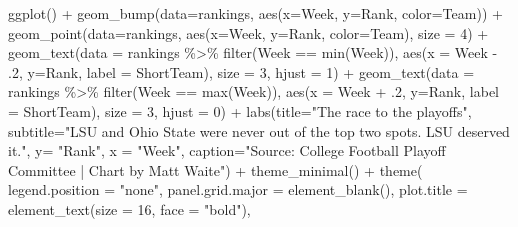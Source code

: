 \documentclass[
]{book}
\newenvironment{Shaded}{\begin{snugshade}}{\end{snugshade}}
\newcommand{\AttributeTok}[1]{\textcolor[rgb]{0.77,0.63,0.00}{#1}}
\newcommand{\DecValTok}[1]{\textcolor[rgb]{0.00,0.00,0.81}{#1}}
\newcommand{\FunctionTok}[1]{\textcolor[rgb]{0.00,0.00,0.00}{#1}}
\newcommand{\NormalTok}[1]{#1}
\newcommand{\SpecialCharTok}[1]{\textcolor[rgb]{0.00,0.00,0.00}{#1}}
\newcommand{\StringTok}[1]{\textcolor[rgb]{0.31,0.60,0.02}{#1}}
\begin{document}
\begin{Shaded}
\begin{Highlighting}[]
\FunctionTok{ggplot}\NormalTok{() }\SpecialCharTok{+} 
  \FunctionTok{geom\_bump}\NormalTok{(}\AttributeTok{data=}\NormalTok{rankings, }\FunctionTok{aes}\NormalTok{(}\AttributeTok{x=}\NormalTok{Week, }\AttributeTok{y=}\NormalTok{Rank, }\AttributeTok{color=}\NormalTok{Team)) }\SpecialCharTok{+} 
  \FunctionTok{geom\_point}\NormalTok{(}\AttributeTok{data=}\NormalTok{rankings, }\FunctionTok{aes}\NormalTok{(}\AttributeTok{x=}\NormalTok{Week, }\AttributeTok{y=}\NormalTok{Rank, }\AttributeTok{color=}\NormalTok{Team), }\AttributeTok{size =} \DecValTok{4}\NormalTok{) }\SpecialCharTok{+}   
  \FunctionTok{geom\_text}\NormalTok{(}\AttributeTok{data =}\NormalTok{ rankings }\SpecialCharTok{\%\textgreater{}\%} \FunctionTok{filter}\NormalTok{(Week }\SpecialCharTok{==} \FunctionTok{min}\NormalTok{(Week)), }\FunctionTok{aes}\NormalTok{(}\AttributeTok{x =}\NormalTok{ Week }\SpecialCharTok{{-}}\NormalTok{ .}\DecValTok{2}\NormalTok{, }\AttributeTok{y=}\NormalTok{Rank, }\AttributeTok{label =}\NormalTok{ ShortTeam), }\AttributeTok{size =} \DecValTok{3}\NormalTok{, }\AttributeTok{hjust =} \DecValTok{1}\NormalTok{) }\SpecialCharTok{+}
  \FunctionTok{geom\_text}\NormalTok{(}\AttributeTok{data =}\NormalTok{ rankings }\SpecialCharTok{\%\textgreater{}\%} \FunctionTok{filter}\NormalTok{(Week }\SpecialCharTok{==} \FunctionTok{max}\NormalTok{(Week)), }\FunctionTok{aes}\NormalTok{(}\AttributeTok{x =}\NormalTok{ Week }\SpecialCharTok{+}\NormalTok{ .}\DecValTok{2}\NormalTok{, }\AttributeTok{y=}\NormalTok{Rank, }\AttributeTok{label =}\NormalTok{ ShortTeam), }\AttributeTok{size =} \DecValTok{3}\NormalTok{, }\AttributeTok{hjust =} \DecValTok{0}\NormalTok{) }\SpecialCharTok{+}
  \FunctionTok{labs}\NormalTok{(}\AttributeTok{title=}\StringTok{"The race to the playoffs"}\NormalTok{, }\AttributeTok{subtitle=}\StringTok{"LSU and Ohio State were never out of the top two spots. LSU deserved it."}\NormalTok{, }\AttributeTok{y=} \StringTok{"Rank"}\NormalTok{, }\AttributeTok{x =} \StringTok{"Week"}\NormalTok{, }\AttributeTok{caption=}\StringTok{"Source: College Football Playoff Committee | Chart by Matt Waite"}\NormalTok{) }\SpecialCharTok{+}
  \FunctionTok{theme\_minimal}\NormalTok{() }\SpecialCharTok{+}
  \FunctionTok{theme}\NormalTok{(}
    \AttributeTok{legend.position =} \StringTok{"none"}\NormalTok{,}
    \AttributeTok{panel.grid.major =} \FunctionTok{element\_blank}\NormalTok{(),}
    \AttributeTok{plot.title =} \FunctionTok{element\_text}\NormalTok{(}\AttributeTok{size =} \DecValTok{16}\NormalTok{, }\AttributeTok{face =} \StringTok{"bold"}\NormalTok{),}

\end{Highlighting}
\end{Shaded}
\end{document}
